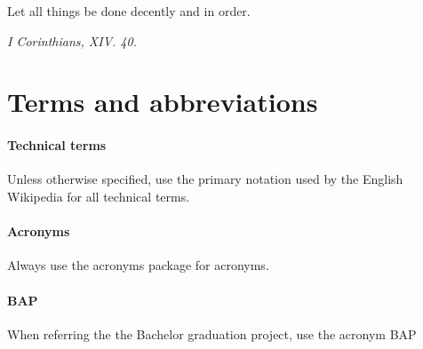 \epigraph{Let all things be done decently and in order.
}{\textit{I Corinthians, XIV. 40.}}
\section{Terms and abbreviations}

\paragraph{Technical terms}
Unless otherwise specified,
use the primary notation used by the English Wikipedia for all technical terms.

\paragraph{Acronyms}
Always use the acronyms package for acronyms.

\paragraph{BAP}
When referring the the Bachelor graduation project, use the acronym BAP

